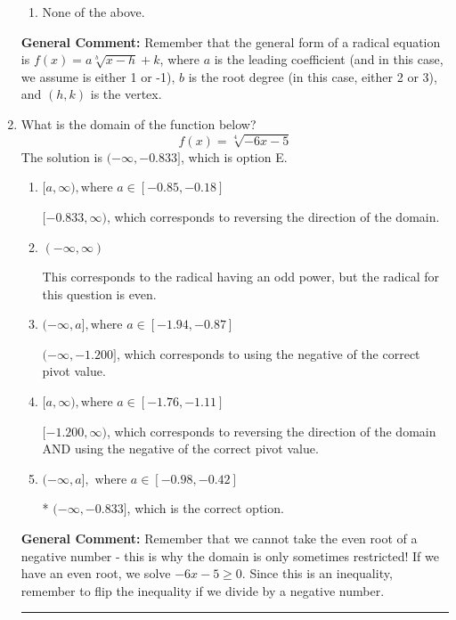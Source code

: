 \documentclass{extbook}[14pt]
\newcommand{\litem}[1]{\item #1

\rule{\textwidth}{0.4pt}}
\begin{document}
\begin{enumerate}
{\begin{enumerate}[label=\Alph*.]
\item None of the above.\end{enumerate}
\textbf{General Comment:} Remember that the general form of a radical equation is $ f(x) = a \sqrt[b]{x - h} + k $, where $a$ is the leading coefficient (and in this case, we assume is either 1 or -1), $b$ is the root degree (in this case, either 2 or 3), and $(h, k)$ is the vertex.
}
\litem{
What is the domain of the function below?
\[ f(x) = \sqrt[4]{-6 x - 5} \]The solution is \( (-\infty, -0.833] \), which is option E.\begin{enumerate}[label=\Alph*.]
\item \( [a, \infty), \text{where } a \in [-0.85, -0.18] \)

 $[-0.833, \infty)$, which corresponds to reversing the direction of the domain.
\item \( (-\infty, \infty) \)

This corresponds to the radical having an odd power, but the radical for this question is even.
\item \( (-\infty, a], \text{where } a \in [-1.94, -0.87] \)

$(-\infty, -1.200]$, which corresponds to using the negative of the correct pivot value.
\item \( [a, \infty), \text{where } a \in [-1.76, -1.11] \)

$[-1.200, \infty)$, which corresponds to reversing the direction of the domain AND using the negative of the correct pivot value.
\item \( (-\infty, a], \text{ where } a \in [-0.98, -0.42] \)

* $(-\infty, -0.833]$, which is the correct option.
\end{enumerate}

\textbf{General Comment:} Remember that we cannot take the even root of a negative number - this is why the domain is only sometimes restricted! If we have an even root, we solve $-6 x - 5 \geq 0$. Since this is an inequality, remember to flip the inequality if we divide by a negative number.
}
\end{enumerate}
\end{document}
